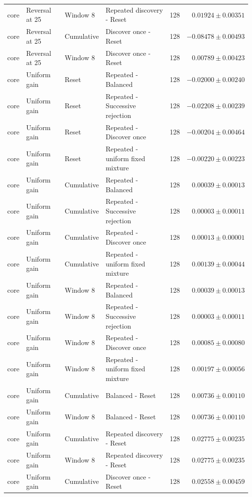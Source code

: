 \begin{longtable}{@{}lp{.19\linewidth}lp{.29\linewidth}rr@{}}
core & Reversal at 25 & Window 8 & Repeated discovery - Reset & 128 & $0.01924 \pm 0.00351$ \\
core & Reversal at 25 & Cumulative & Discover once - Reset & 128 & $-0.08478 \pm 0.00493$ \\
core & Reversal at 25 & Window 8 & Discover once - Reset & 128 & $0.00789 \pm 0.00423$ \\
core & Uniform gain & Reset & Repeated - Balanced & 128 & $-0.02000 \pm 0.00240$ \\
core & Uniform gain & Reset & Repeated - Successive rejection & 128 & $-0.02208 \pm 0.00239$ \\
core & Uniform gain & Reset & Repeated - Discover once & 128 & $-0.00204 \pm 0.00464$ \\
core & Uniform gain & Reset & Repeated - uniform fixed mixture & 128 & $-0.00220 \pm 0.00223$ \\
core & Uniform gain & Cumulative & Repeated - Balanced & 128 & $0.00039 \pm 0.00013$ \\
core & Uniform gain & Cumulative & Repeated - Successive rejection & 128 & $0.00003 \pm 0.00011$ \\
core & Uniform gain & Cumulative & Repeated - Discover once & 128 & $0.00013 \pm 0.00001$ \\
core & Uniform gain & Cumulative & Repeated - uniform fixed mixture & 128 & $0.00139 \pm 0.00044$ \\
core & Uniform gain & Window 8 & Repeated - Balanced & 128 & $0.00039 \pm 0.00013$ \\
core & Uniform gain & Window 8 & Repeated - Successive rejection & 128 & $0.00003 \pm 0.00011$ \\
core & Uniform gain & Window 8 & Repeated - Discover once & 128 & $0.00085 \pm 0.00080$ \\
core & Uniform gain & Window 8 & Repeated - uniform fixed mixture & 128 & $0.00197 \pm 0.00056$ \\
core & Uniform gain & Cumulative & Balanced - Reset & 128 & $0.00736 \pm 0.00110$ \\
core & Uniform gain & Window 8 & Balanced - Reset & 128 & $0.00736 \pm 0.00110$ \\
core & Uniform gain & Cumulative & Repeated discovery - Reset & 128 & $0.02775 \pm 0.00235$ \\
core & Uniform gain & Window 8 & Repeated discovery - Reset & 128 & $0.02775 \pm 0.00235$ \\
core & Uniform gain & Cumulative & Discover once - Reset & 128 & $0.02558 \pm 0.00459$ \\

\end{longtable}
